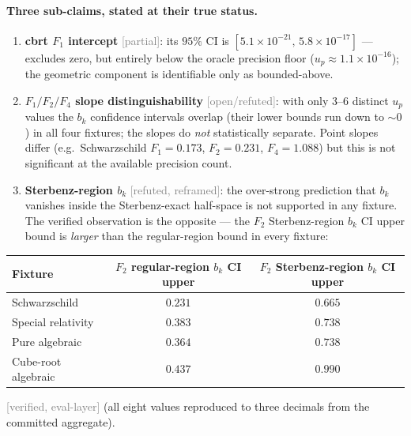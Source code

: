 \documentclass[11pt,a4paper]{article}
\newcommand{\status}[1]{\textcolor{gray}{\small\textsf{[#1]}}}
\begin{document}
\paragraph{Three sub-claims, stated at their true status.}
\begin{enumerate}
    \item \textbf{cbrt $F_1$ intercept} \status{partial}: its $95\%$ CI is $[5.1\times10^{-21},\,5.8\times10^{-17}]$ --- excludes zero, but entirely below the oracle precision floor ($u_p\approx1.1\times10^{-16}$); the geometric component is identifiable only as bounded-above.
    \item \textbf{$F_1/F_2/F_4$ slope distinguishability} \status{open/refuted}: with only $3$--$6$ distinct $u_p$ values the $b_k$ confidence intervals overlap (their lower bounds run down to $\sim0$) in all four fixtures; the slopes do \emph{not} statistically separate. Point slopes differ (e.g.\ Schwarzschild $F_1{=}0.173$, $F_2{=}0.231$, $F_4{=}1.088$) but this is not significant at the available precision count.
    \item \textbf{Sterbenz-region $b_k$} \status{refuted, reframed}: the over-strong prediction that $b_k$ vanishes inside the Sterbenz-exact half-space is not supported in any fixture. The verified observation is the opposite --- the $F_2$ Sterbenz-region $b_k$ CI upper bound is \emph{larger} than the regular-region bound in every fixture:
\end{enumerate}

\begin{center}
\begin{tabular}{lcc}
\toprule
Fixture & $F_2$ regular-region $b_k$ CI upper & $F_2$ Sterbenz-region $b_k$ CI upper \\
\midrule
Schwarzschild & $0.231$ & $0.665$ \\
Special relativity & $0.383$ & $0.738$ \\
Pure algebraic & $0.364$ & $0.738$ \\
Cube-root algebraic & $0.437$ & $0.990$ \\
\bottomrule
\end{tabular}
\end{center}
\status{verified, eval-layer} (all eight values reproduced to three decimals from the committed aggregate).
\end{document}
